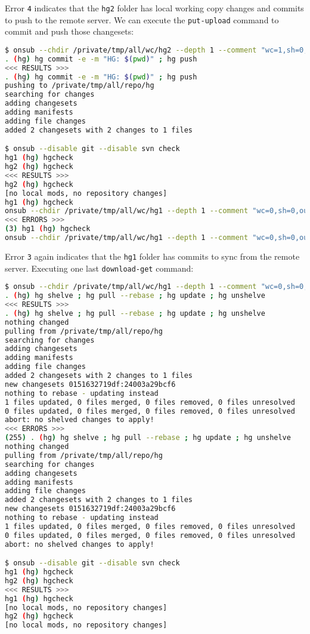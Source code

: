 Error \lstinline{4} indicates that the \lstinline{hg2} folder has local working copy changes and commits to push to the remote server. We can execute the \lstinline{put-upload} command to commit and push those changesets:

\begin{snugshade}
\begin{lstlisting}[language=bash]	
$ onsub --chdir /private/tmp/all/wc/hg2 --depth 1 --comment "wc=1,sh=0,out=1,in=0" {put-upload}
. (hg) hg commit -e -m "HG: $(pwd)" ; hg push
<<< RESULTS >>>
. (hg) hg commit -e -m "HG: $(pwd)" ; hg push
pushing to /private/tmp/all/repo/hg
searching for changes
adding changesets
adding manifests
adding file changes
added 2 changesets with 2 changes to 1 files

$ onsub --disable git --disable svn check
hg1 (hg) hgcheck
hg2 (hg) hgcheck
<<< RESULTS >>>
hg2 (hg) hgcheck
[no local mods, no repository changes]
hg1 (hg) hgcheck
onsub --chdir /private/tmp/all/wc/hg1 --depth 1 --comment "wc=0,sh=0,out=0,in=2" {download-get}
<<< ERRORS >>>
(3) hg1 (hg) hgcheck
onsub --chdir /private/tmp/all/wc/hg1 --depth 1 --comment "wc=0,sh=0,out=0,in=2" {download-get}
\end{lstlisting}
\end{snugshade}

Error \lstinline{3} again indicates that the \lstinline{hg1} folder has commits to sync from the remote server. Executing one last \lstinline{download-get} command:

\begin{snugshade}
\begin{lstlisting}[language=bash]	
$ onsub --chdir /private/tmp/all/wc/hg1 --depth 1 --comment "wc=0,sh=0,out=0,in=2" {download-get}
. (hg) hg shelve ; hg pull --rebase ; hg update ; hg unshelve
<<< RESULTS >>>
. (hg) hg shelve ; hg pull --rebase ; hg update ; hg unshelve
nothing changed
pulling from /private/tmp/all/repo/hg
searching for changes
adding changesets
adding manifests
adding file changes
added 2 changesets with 2 changes to 1 files
new changesets 0151632719df:24003a29bcf6
nothing to rebase - updating instead
1 files updated, 0 files merged, 0 files removed, 0 files unresolved
0 files updated, 0 files merged, 0 files removed, 0 files unresolved
abort: no shelved changes to apply!
<<< ERRORS >>>
(255) . (hg) hg shelve ; hg pull --rebase ; hg update ; hg unshelve
nothing changed
pulling from /private/tmp/all/repo/hg
searching for changes
adding changesets
adding manifests
adding file changes
added 2 changesets with 2 changes to 1 files
new changesets 0151632719df:24003a29bcf6
nothing to rebase - updating instead
1 files updated, 0 files merged, 0 files removed, 0 files unresolved
0 files updated, 0 files merged, 0 files removed, 0 files unresolved
abort: no shelved changes to apply!

$ onsub --disable git --disable svn check
hg1 (hg) hgcheck
hg2 (hg) hgcheck
<<< RESULTS >>>
hg1 (hg) hgcheck
[no local mods, no repository changes]
hg2 (hg) hgcheck
[no local mods, no repository changes]
\end{lstlisting}
\end{snugshade}

